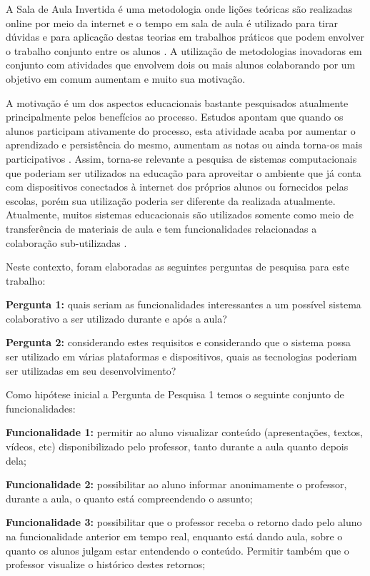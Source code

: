 A Sala de Aula Invertida é uma metodologia onde lições teóricas são realizadas online por meio da internet e o tempo em sala de aula é utilizado para tirar dúvidas e para aplicação destas teorias em trabalhos práticos que podem envolver o trabalho conjunto entre os alunos \cite{staker_classifying_2012}. A utilização de metodologias inovadoras em conjunto com atividades que envolvem dois ou mais alunos colaborando por um objetivo em comum aumentam e muito sua motivação.

A motivação é um dos aspectos educacionais bastante pesquisados atualmente principalmente pelos benefícios ao processo. Estudos apontam que quando os alunos participam ativamente do processo, esta atividade acaba por aumentar o aprendizado e persistência do mesmo, aumentam as notas ou ainda torna-os mais participativos \cite{felder1992quick}. Assim, torna-se relevante a pesquisa de sistemas computacionais que poderiam ser utilizados na educação para aproveitar o ambiente que já conta com dispositivos conectados à internet dos próprios alunos ou fornecidos pelas escolas, porém sua utilização poderia ser diferente da realizada atualmente. Atualmente, muitos sistemas educacionais são utilizados somente como meio de transferência de materiais de aula e tem funcionalidades relacionadas a colaboração sub-utilizadas \cite{fulano}.

Neste contexto, foram elaboradas as seguintes perguntas de pesquisa para este trabalho:

\textbf{Pergunta 1:} quais seriam as funcionalidades interessantes a um possível sistema colaborativo a ser utilizado durante e após a aula?

\textbf{Pergunta 2:} considerando estes requisitos e considerando que o sistema possa ser utilizado em várias plataformas e dispositivos, quais as tecnologias poderiam ser utilizadas em seu desenvolvimento?

Como hipótese inicial a Pergunta de Pesquisa 1 temos o seguinte conjunto de funcionalidades:

\textbf{Funcionalidade 1:} permitir ao aluno visualizar conteúdo (apresentações, textos, vídeos, etc) disponibilizado pelo professor, tanto durante a aula quanto depois dela;

\textbf{Funcionalidade 2:} possibilitar ao aluno informar anonimamente o professor, durante a aula, o quanto está compreendendo o assunto;

\textbf{Funcionalidade 3:} possibilitar que o professor receba o retorno dado pelo aluno na funcionalidade anterior em tempo real, enquanto está dando aula, sobre o quanto os alunos julgam estar entendendo o conteúdo. Permitir também que o professor visualize o histórico destes retornos;

